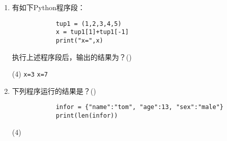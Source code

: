 \documentclass[11pt]{ctexart}
\begin{document}
\begin{enumerate}
        \item 有如下Python程序段：
        \begin{lstlisting}
            tup1 = (1,2,3,4,5)
            x = tup1[1]+tup1[-1]
            print("x=",x)
        \end{lstlisting}
        执行上述程序段后，输出的结果为？(\qquad)
        \begin{tasks}(4)
            \task \lstinline!x=3!
            \task \lstinline!x=7!
        \end{tasks}

        \item 下列程序运行的结果是？(\qquad)
        \begin{lstlisting}
            infor = {"name":"tom", "age":13, "sex":"male"}
            print(len(infor))
        \end{lstlisting}
        \begin{tasks}(4)
        \end{tasks}
    \end{enumerate}
\end{document}
